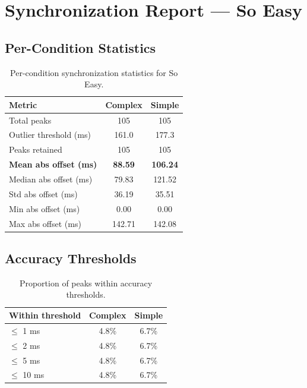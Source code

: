 
\section*{Synchronization Report --- So Easy}

\subsection*{Per-Condition Statistics}

\begin{table}[h!]
\centering
\begin{tabular}{|l|c|c|}
\hline
Metric & Complex & Simple \\
\hline
Total peaks & 105 & 105 \\
Outlier threshold (ms) & 161.0 & 177.3 \\
Peaks retained & 105 & 105 \\
\textbf{Mean abs offset (ms)} & \textbf{88.59} & \textbf{106.24} \\
Median abs offset (ms) & 79.83 & 121.52 \\
Std abs offset (ms) & 36.19 & 35.51 \\
Min abs offset (ms) & 0.00 & 0.00 \\
Max abs offset (ms) & 142.71 & 142.08 \\
\hline
\end{tabular}
\caption{Per-condition synchronization statistics for So Easy.}
\label{tab:sync_stats}
\end{table}

\subsection*{Accuracy Thresholds}

\begin{table}[h!]
\centering
\begin{tabular}{|l|c|c|}
\hline
Within threshold & Complex & Simple \\
\hline
$\leq$ 1 ms & 4.8\% & 6.7\% \\
$\leq$ 2 ms & 4.8\% & 6.7\% \\
$\leq$ 5 ms & 4.8\% & 6.7\% \\
$\leq$ 10 ms & 4.8\% & 6.7\% \\
\hline
\end{tabular}
\caption{Proportion of peaks within accuracy thresholds.}
\label{tab:sync_accuracy}
\end{table}

